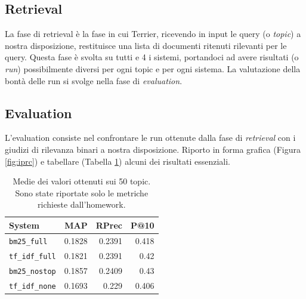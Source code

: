 \documentclass[letterpaper, 10 pt, conference]{ieeeconf}  %
\begin{document}
\subsection{Retrieval}
La fase di retrieval è la fase in cui Terrier, ricevendo in input le query (o \textit{topic}) a nostra disposizione, restituisce una lista di documenti ritenuti rilevanti per le query. Questa fase è svolta su tutti e 4 i sistemi, portandoci ad avere risultati (o \textit{run}) possibilmente diversi per ogni topic e per ogni sistema. La valutazione della bontà delle run si svolge nella fase di \textit{evaluation}.
\subsection{Evaluation}
\label{subsec:eval}
L'evaluation consiste nel confrontare le run ottenute dalla fase di \textit{retrieval} con i giudizi di rilevanza binari a nostra disposizione. Riporto in forma grafica (Figura \ref{fig:iprc}) e tabellare (Tabella \ref{tab:recap}) alcuni dei risultati essenziali.


\begin{table}[h]
\centering
\begin{tabular}{|l|r|r|r|}
\hline
\textbf{System}      & \textbf{MAP} & \textbf{RPrec} & \textbf{P@10} \\ \hline
\texttt{bm25\_full}   & 0.1828       & 0.2391         & 0.418         \\ 
\texttt{tf\_idf\_full} & 0.1821       & 0.2391         & 0.42          \\ 
\texttt{bm25\_nostop} & 0.1857       & 0.2409         & 0.43          \\ 
\texttt{tf\_idf\_none} & 0.1693       & 0.229          & 0.406         \\ \hline
\end{tabular}
\caption{Medie dei valori ottenuti sui 50 topic. Sono state riportate solo le metriche richieste dall'homework.}
\label{tab:recap}
\end{table}
\end{document}

